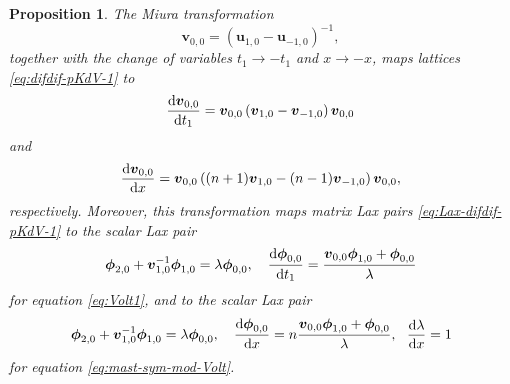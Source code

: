 \documentclass[dvips,10pt]{article}
\newcommand{\bs}{\boldsymbol}
\newcommand{\bsv}{ {\bs{v}}}
\newtheorem{proposition}{Proposition}
\theoremstyle{remark} %
\begin{document}
	\begin{proposition}
		The Miura transformation 	
		\begin{equation} \label{eq:Miura-pot}
			{\bs{v}}_{0,0} = \left({\bs{u}}_{1,0} -{\bs{u}}_{-1,0}\right)^{-1},
		\end{equation}
		together with the change of variables $t_1 \rightarrow -t_1$ and $x \rightarrow -x$, maps lattices \eqref{eq:difdif-pKdV-1} to
		\begin{equation} \label{eq:Volt1}
			\frac{{\rm{d}} {\bs{v}}_{0,0}}{{\rm{d}} t_1} =   {\bs{v}}_{0,0} \left( {\bs{v}}_{1,0} - {\bs{v}}_{-1,0}\right) {\bs{v}}_{0,0}
		\end{equation}
		and
		\begin{equation} \label{eq:mast-sym-mod-Volt}
			\frac{{\rm{d}} {\bs{v}}_{0,0}}{{\rm{d}} x} =  {\bs{v}}_{0,0} \left((n+1) {\bs{v}}_{1,0} - (n-1) {\bs{v}}_{-1,0}\right) {\bs{v}}_{0,0},
		\end{equation}
		respectively. Moreover, this transformation maps matrix Lax pairs \eqref{eq:Lax-difdif-pKdV-1} to the scalar Lax pair
		\begin{equation}  \label{eq:Lax-pair-Volt}
			\bs{\phi}_{2,0} + \bsv_{1,0}^{-1} \bs{\phi}_{1,0} = \lambda \bs{\phi}_{0,0}, ~~~ \frac{{\rm{d}} {\bs{\phi}}_{0,0}}{{\rm{d}} t_1} = \frac{\bsv_{0,0} \bs{\phi}_{1,0} + \bs{\phi}_{0,0}}{\lambda}
		\end{equation}
		for equation \eqref{eq:Volt1}, and to the scalar Lax pair
		\begin{equation}  \label{eq:Lax-pair-mast-Volt}
			\bs{\phi}_{2,0} + \bsv_{1,0}^{-1} \bs{\phi}_{1,0} = \lambda \bs{\phi}_{0,0},~~~ \frac{{\rm{d}} {\bs{\phi}}_{0,0}}{{\rm{d}} x} = n \frac{\bsv_{0,0} \bs{\phi}_{1,0} + \bs{\phi}_{0,0}}{\lambda}, ~~ \frac{{\rm{d}} \lambda}{{\rm{d}} x} = 1
		\end{equation}
		for equation \eqref{eq:mast-sym-mod-Volt}.
	\end{proposition}
	
\end{document}

